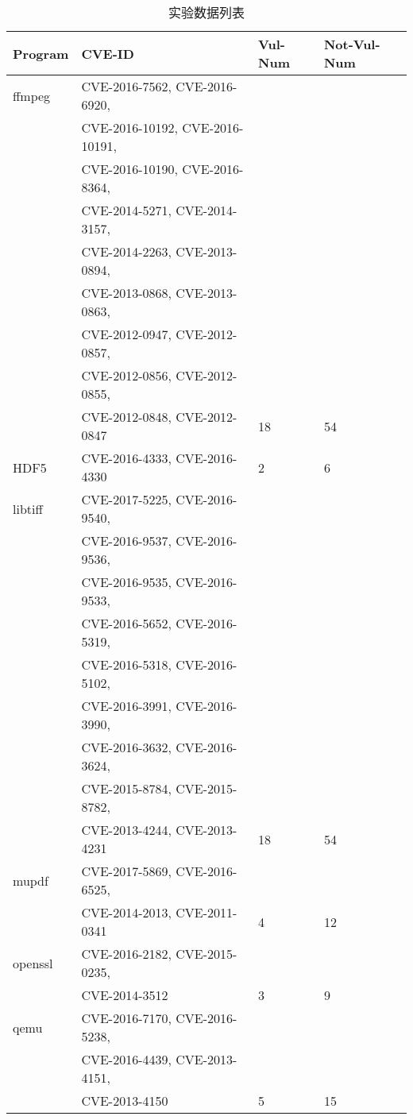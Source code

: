 {\begin{table}[ht]
\begin{center}
\caption{实验数据列表} \label{CVE_List_For_Attribute_Extraction}
\begin{small}
\begin{tabular}{llll}
\hline
{\bf Program } & {\bf CVE-ID} & {\bf Vul-Num} & {\bf Not-Vul-Num}\\ \hline
ffmpeg & CVE-2016-7562, CVE-2016-6920, \\ &CVE-2016-10192, CVE-2016-10191,\\　& CVE-2016-10190, CVE-2016-8364,\\ & CVE-2014-5271, CVE-2014-3157,\\ & CVE-2014-2263, CVE-2013-0894,\\ & CVE-2013-0868, CVE-2013-0863,\\ & CVE-2012-0947, CVE-2012-0857,\\ & CVE-2012-0856, CVE-2012-0855,\\ & CVE-2012-0848, CVE-2012-0847 & 18 & 54\\ \hline

HDF5 & CVE-2016-4333, CVE-2016-4330 & 2 & 6　\\ \hline

libtiff & CVE-2017-5225, CVE-2016-9540, \\ & CVE-2016-9537, CVE-2016-9536, \\ & CVE-2016-9535, CVE-2016-9533, \\ & CVE-2016-5652, CVE-2016-5319, \\ & CVE-2016-5318, CVE-2016-5102, \\ & CVE-2016-3991, CVE-2016-3990, \\ & CVE-2016-3632, CVE-2016-3624, \\ & CVE-2015-8784, CVE-2015-8782, \\ & CVE-2013-4244, CVE-2013-4231 & 18 & 54 \\ \hline

mupdf & CVE-2017-5869, CVE-2016-6525, \\ & CVE-2014-2013, CVE-2011-0341 & 4 & 12\\ \hline

openssl & CVE-2016-2182, CVE-2015-0235,\\ & CVE-2014-3512 & 3 & 9\\ \hline

qemu & CVE-2016-7170, CVE-2016-5238,\\ & CVE-2016-4439, CVE-2013-4151,\\ &  CVE-2013-4150 
 & 5 & 15\\ \hline
 

\end{tabular}
\end{small}
\end{center}
\end{table}}
